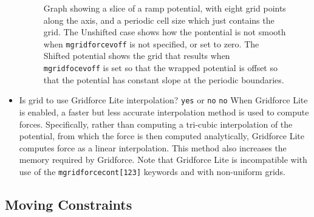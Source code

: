 \begin{itemize}
\begin{figure}[htb]
  \caption[Graph showing a slice of a ramp potential, showing the effect of 
           {\tt mgridforcevoff}]
  {\small Graph showing a slice of a ramp potential, with eight grid points along the axis, and a periodic cell size which just contains the grid. The Unshifted case shows how the pontential is not smooth when {\tt mgridforcevoff} is not specified, or set to zero. The Shifted potential shows the grid that results when {\tt mgridfocevoff} is set so that the wrapped potential is offset so that the potential has constant slope at the periodic boundaries.}
  \label{fig:gridshift}
\end{figure}

\item
{}
{Is grid to use Gridforce Lite interpolation?}
{{\tt yes} or {\tt no}}
{{\tt no}}
{When Gridforce Lite is enabled, a faster but less accurate interpolation method is used to compute forces.
Specifically, rather than computing a tri-cubic interpolation of the potential, from which the force is then computed analytically, Gridforce Lite computes force as a linear interpolation.
This method also increases the memory required by Gridforce.
Note that Gridforce Lite is incompatible with use of the {\tt mgridforcecont[123]} keywords and with non-uniform grids.
}

\end{itemize}

\subsection{Moving Constraints}

